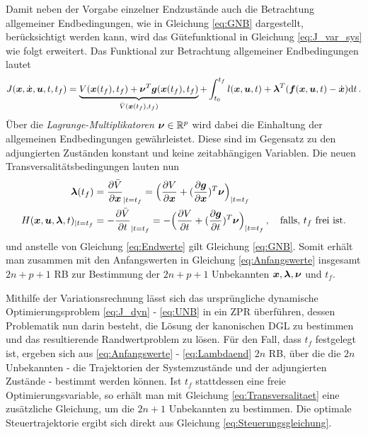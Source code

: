Damit neben der Vorgabe einzelner Endzustände auch die Betrachtung allgemeiner Endbedingungen, wie in Gleichung \ref{eq:GNB} dargestellt, berücksichtigt werden kann, wird das Gütefunktional in Gleichung \ref{eq:J_var_sys} wie folgt erweitert. Das Funktional zur Betrachtung allgemeiner Endbedingungen lautet
\begin{equation}
J(\boldsymbol{x},\dot{\boldsymbol{x}},\boldsymbol{u},t,t_f) = \underbrace{V(\boldsymbol{x}(t_f),t_f) + \boldsymbol{\nu}^T\boldsymbol{g}(\boldsymbol{x}(t_f),t_f)}_{\bar{V}(\boldsymbol{x}(t_f),t_f)} + \int_{t_0}^{t_f}l(\boldsymbol{x},\boldsymbol{u},t) + \boldsymbol{\lambda}^T(\boldsymbol{f}(\boldsymbol{x},\boldsymbol{u},t) - \dot{\boldsymbol{x}})\textrm{d}{t}\,. \label{eq:J_var_sys_allgemein}
\end{equation}
Über die \textit{Lagrange-Multiplikatoren} $\boldsymbol{\nu}\in\mathbb{R}^p$ wird dabei die Einhaltung der allgemeinen Endbedingungen gewährleistet. Diese sind im Gegensatz zu den adjungierten Zuständen konstant und keine zeitabhängigen Variablen. Die neuen Transversalitätsbedingungen lauten nun \cite{KnutGraichen.2012}
\begin{align}
\boldsymbol{\lambda}(t_f) &= \frac{\partial \bar{V}}{\partial \boldsymbol{x}}_{|t=t_f} = \Big(\frac{\partial V}{\partial \boldsymbol{x}} + (\frac{\partial \boldsymbol{g}}{\partial \boldsymbol{x}})^T\boldsymbol{\nu}\Big)_{|t=t_f} \label{eq:Lambdaend_allgemein} \\
H(\boldsymbol{x},\boldsymbol{u},\boldsymbol{\lambda},t)_{|t=t_f} &= - \frac{\partial \bar{V}}{\partial t}_{|t=t_f} = -\Big(\frac{\partial V}{\partial t}+(\frac{\partial \boldsymbol{g}}{\partial t})^T\boldsymbol{\nu}\Big)_{|t=t_f}\,,\quad \textrm{falls, $t_f$ frei ist.} \label{eq:Transversalitaet_allgemein}
\end{align}
und anstelle von Gleichung \ref{eq:Endwerte} gilt Gleichung \ref{eq:GNB}. Somit erhält man zusammen mit den Anfangswerten in Gleichung \ref{eq:Anfangswerte} insgesamt $2n+p+1$ \gls{RB} zur Bestimmung der $2n+p+1$ Unbekannten $\boldsymbol{x}, \boldsymbol{\lambda}, \boldsymbol{\nu}$ und $t_f$. 

Mithilfe der Variationsrechnung lässt sich das ursprüngliche dynamische Optimierungsproblem \ref{eq:J_dyn} - \ref{eq:UNB} in ein \gls{ZPR} überführen, dessen Problematik nun darin besteht, die Lösung der kanonischen \gls{DGL} zu bestimmen und das resultierende Randwertproblem zu lösen. Für den Fall, dass $t_f$ festgelegt ist, ergeben sich aus \ref{eq:Anfangswerte} - \ref{eq:Lambdaend} $2n$ \gls{RB}, über die die $2n$ Unbekannten - die Trajektorien der Systemzustände und der adjungierten Zustände - bestimmt werden können. Ist $t_f$ stattdessen eine freie Optimierungsvariable, so erhält man mit Gleichung \ref{eq:Transversalitaet} eine zusätzliche Gleichung, um die $2n+1$ Unbekannten zu bestimmen. Die optimale Steuertrajektorie ergibt sich direkt aus Gleichung \ref{eq:Steuerungsgleichung}. 

